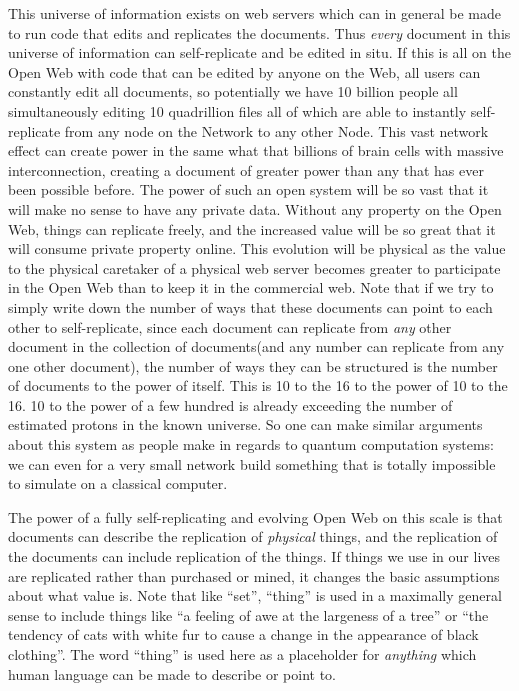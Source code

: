 This universe of information exists on web servers which can in general
be made to run code that edits and replicates the documents. Thus
\emph{every} document in this universe of information can self-replicate
and be edited in situ. If this is all on the Open Web with code that can
be edited by anyone on the Web, all users can constantly edit all
documents, so potentially we have 10 billion people all simultaneously
editing 10 quadrillion files all of which are able to instantly
self-replicate from any node on the Network to any other Node. This vast
network effect can create power in the same what that billions of brain
cells with massive interconnection, creating a document of greater power
than any that has ever been possible before. The power of such an open
system will be so vast that it will make no sense to have any private
data. Without any property on the Open Web, things can replicate freely,
and the increased value will be so great that it will consume private
property online. This evolution will be physical as the value to the
physical caretaker of a physical web server becomes greater to
participate in the Open Web than to keep it in the commercial web. Note
that if we try to simply write down the number of ways that these
documents can point to each other to self-replicate, since each document
can replicate from \emph{any} other document in the collection of
documents(and any number can replicate from any one other document), the
number of ways they can be structured is the number of documents to the
power of itself. This is 10 to the 16 to the power of 10 to the 16. 10
to the power of a few hundred is already exceeding the number of
estimated protons in the known universe. So one can make similar
arguments about this system as people make in regards to quantum
computation systems: we can even for a very small network build
something that is totally impossible to simulate on a classical
computer.

The power of a fully self-replicating and evolving Open Web on this
scale is that documents can describe the replication of \emph{physical}
things, and the replication of the documents can include replication of
the things. If things we use in our lives are replicated rather than
purchased or mined, it changes the basic assumptions about what value
is. Note that like ``set'', ``thing'' is used in a maximally general
sense to include things like ``a feeling of awe at the largeness of a
tree'' or ``the tendency of cats with white fur to cause a change in the
appearance of black clothing''. The word ``thing'' is used here as a
placeholder for \emph{anything} which human language can be made to
describe or point to.

